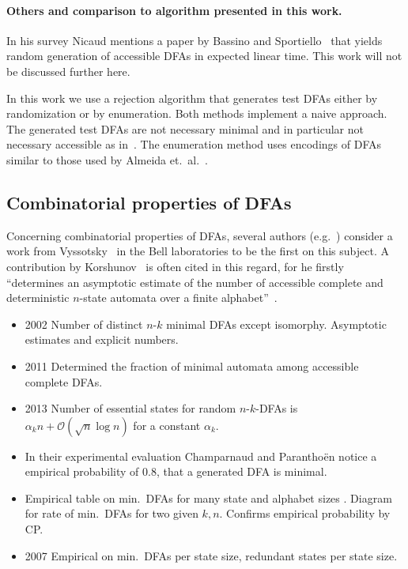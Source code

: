 \paragraph*{Others and comparison to algorithm presented in this work.}

In his survey Nicaud mentions a paper by Bassino and Sportiello~\cite{BS13} that yields random generation of accessible DFAs in expected linear time. This work will not be discussed further here.

In this work we use a rejection algorithm that generates test DFAs either by randomization or by enumeration. Both methods implement a naive approach. The generated test DFAs are not necessary minimal and in particular not necessary accessible as in~\cite{CN12}. The enumeration method uses encodings of DFAs similar to those used by Almeida et.\ al.~\cite{RMA05}.

\subsection{Combinatorial properties of DFAs}

Concerning combinatorial properties of DFAs, several authors (e.g.~\cite{BN07, DKS02, HJ14}) consider a work from Vyssotsky~\cite{Vys59} in the Bell laboratories to be the first on this subject. A contribution by Korshunov~\cite{Kor78} is often cited in this regard, for he firstly ``determines an asymptotic estimate of the number of accessible complete and deterministic $n$-state automata over a finite alphabet''~\cite{BDS11}.

\begin{itemize}
	
	
    \item 2002 \cite{DKS02} Number of distinct $n$-$k$ minimal DFAs except isomorphy. Asymptotic estimates and explicit numbers.
    
    \item 2011 \cite{BDS11} Determined the fraction of minimal automata among accessible complete DFAs.
    
    \item 2013 \cite{BK13} Number of essential states for random $n$-$k$-DFAs is $\alpha_k n + \mathcal{O}(\sqrt{n}\log n)$ for a constant $\alpha_k$.
    
    
   	\item  In their experimental evaluation\cite[p. 14]{CP05} Champarnaud and Paranthoën notice a empirical probability of $0.8$, that a generated DFA is minimal.
   	
   	\item Empirical table on min.\ DFAs for many state and alphabet sizes \cite[p. 11]{AMR09}. Diagram for rate of min.\ DFAs for two given $k,n$. Confirms empirical probability by CP.
   	
   	\item 2007 \cite{BDN07} Empirical on min.\ DFAs per state size, redundant states per state size.
\end{itemize}

